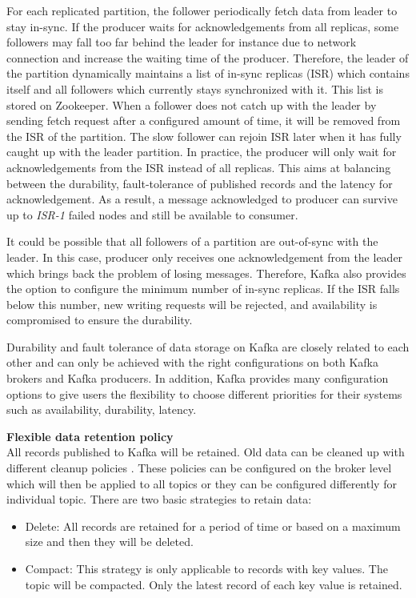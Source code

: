 For each replicated partition, the follower periodically fetch data from leader to stay in-sync. If the producer waits for acknowledgements from all replicas, some followers may fall too far behind the leader for instance due to network connection and increase the waiting time of the producer. Therefore, the leader of the partition dynamically maintains a list of in-sync replicas (ISR) which contains itself and all followers which currently stays synchronized with it. This list is stored on Zookeeper. When a follower does not catch up with the leader by sending fetch request after a configured amount of time, it will be removed from the ISR of the partition. The slow follower can rejoin ISR later when it has fully caught up with the leader partition. In practice, the producer will only wait for acknowledgements from the ISR instead of all replicas. This aims at balancing between the durability, fault-tolerance of published records and the latency for acknowledgement. As a result, a message acknowledged to producer can survive up to \emph{ISR-1} failed nodes and still be available to consumer.

It could be possible that all followers of a partition are out-of-sync with the leader. In this case, producer only receives one acknowledgement from the leader which brings back the problem of losing messages. Therefore, Kafka also provides the option to configure the minimum number of in-sync replicas. If the ISR falls below this number, new writing requests will be rejected, and availability is compromised to ensure the durability.

Durability and fault tolerance of data storage on Kafka are closely related to each other and can only be achieved with the right configurations on both Kafka brokers and Kafka producers. In addition, Kafka provides many configuration options to give users the flexibility to choose different priorities for their systems such as availability, durability, latency. 

\textbf{Flexible data retention policy}\\
All records published to Kafka will be retained. Old data can be cleaned up with different cleanup policies \cite{kafkaconfigurationtopic}. These policies can be configured on the broker level which will then be applied to all topics or they can be configured differently for individual topic. There are two basic strategies to retain data:
\begin{itemize}
	\item Delete: All records are retained for a period of time or based on a maximum size and then they will be deleted.
	\item Compact: This strategy is only applicable to records with key values. The topic will be compacted. Only the latest record of each key value is retained.
\end{itemize}

